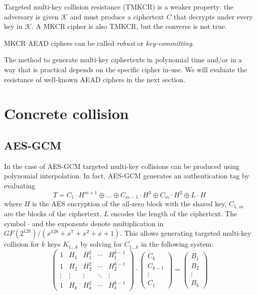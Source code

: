 \documentclass[9pt, a4paper]{article}
\begin{document}
Targeted multi-key collision resistance (TMKCR) is a weaker property: the adversary is given $\mathcal K$ and must produce a ciphertext $C$ that decrypts under every key in $\mathcal K$.
A MKCR cipher is also TMKCR, but the converse is not true.

MKCR AEAD ciphers can be called \emph{robust} or \emph{key-committing}.

The method to generate multi-key ciphertexts in polynomial time
and/or in a way that is practical
depends on the specific cipher in-use.
We will evaluate the resistance of well-known AEAD ciphers
in the next section.


\section{Concrete collision}
\subsection{AES-GCM}
In the case of AES-GCM
targeted multi-key collisions can be produced using polynomial interpolation.
In fact, AES-GCM generates an authentication tag by evaluating
\begin{equation}
	T =
	C_1 \cdot H^{m+1}
	\oplus
	...
	\oplus
	C_{m-1} \cdot H^3
	\oplus
	C_m \cdot H^2
	\oplus
	L \cdot H
	\label{auth}
\end{equation}
where
$H$ is the AES encryption of the all-zero block with the shared key,
$C_{1..m}$ are the blocks of the ciphertext,
$L$ encodes the length of the ciphertext.
The symbol $\cdot$ and the exponents denote multiplication in $GF(2^{128})/(x^{128} + x^7 + x^2 +x +1)$.
This allows generating targeted multi-key collision for $k$ keys $K_{1...k}$ by solving for $C_{1...k}$ in the following system:
\begin{equation}
\begin{pmatrix}
	1 & H_1 & H_1^2 & \cdots & H_1^{k-1}
	\\
	1 & H_2 & H_2^2 & \cdots & H_2^{k-1}
	\\
	\vdots & \vdots & \vdots & \ddots & \vdots
	\\
	1 & H_k & H_k^2 & \cdots & H_k^{k-1}
\end{pmatrix}
\cdot
\begin{pmatrix}
	C_k
	\\
	C_{k-1}
	\\
	\vdots
	\\
	C_1
\end{pmatrix}
=
\begin{pmatrix}
	B_1
	\\
	B_2
	\\
	\vdots
	\\
	B_k
\end{pmatrix}
\end{equation}
\end{document}
